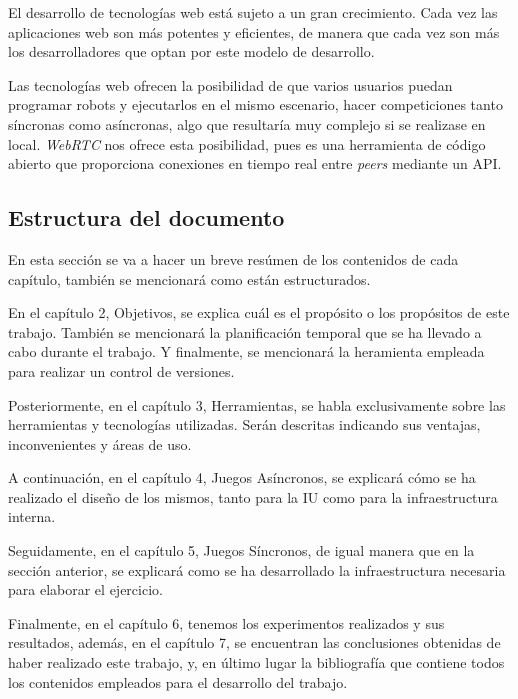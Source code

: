 \documentclass[a4paper, 12pt]{book}
\begin{document}
El desarrollo de tecnologías web está sujeto a un gran crecimiento. Cada vez las aplicaciones web son más potentes y eficientes, de manera que cada vez son más los desarrolladores que optan por este modelo de desarrollo.

Las tecnologías web ofrecen la posibilidad de que varios usuarios puedan programar robots y ejecutarlos en el mismo escenario, hacer competiciones tanto síncronas como asíncronas, algo que resultaría muy complejo si se realizase en local. \emph{WebRTC} nos ofrece esta posibilidad, pues es una herramienta de código abierto que proporciona conexiones en tiempo real entre \emph{peers} mediante un API.

\subsection{Estructura del documento}

En esta sección se va a hacer un breve resúmen de los contenidos de cada capítulo, también se mencionará como están estructurados.

En el capítulo 2, Objetivos, se explica cuál es el propósito o los propósitos de este trabajo. También se mencionará la planificación temporal que se ha llevado a cabo durante el trabajo. Y finalmente, se mencionará la heramienta empleada para realizar un control de versiones.

Posteriormente, en el capítulo 3, Herramientas, se habla exclusivamente sobre las herramientas y tecnologías utilizadas. Serán descritas indicando sus ventajas, inconvenientes y áreas de uso.

A continuación, en el capítulo 4, Juegos Asíncronos, se explicará cómo se ha realizado el diseño de los mismos, tanto para la IU como para la infraestructura interna.

Seguidamente, en el capítulo 5, Juegos Síncronos, de igual manera que en la sección anterior, se explicará como se ha desarrollado la infraestructura necesaria para elaborar el ejercicio.

Finalmente, en el capítulo 6, tenemos los experimentos realizados y sus resultados, además, en el capítulo 7, se encuentran las conclusiones obtenidas de haber realizado este trabajo, y, en último lugar la bibliografía que contiene todos los contenidos empleados para el desarrollo del trabajo.

\end{document}
